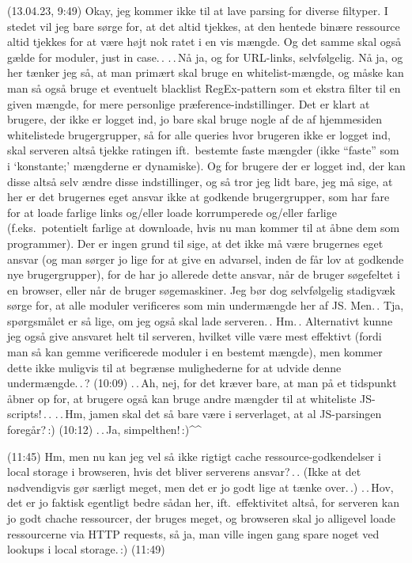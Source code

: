 \documentclass{report}
\begin{document}
(13.04.23, 9:49) Okay, jeg kommer ikke til at lave parsing for diverse filtyper. I stedet vil jeg bare sørge for, at det altid tjekkes, at den hentede binære ressource altid tjekkes for at være højt nok ratet i en vis mængde. Og det samme skal også gælde for moduler, just in case.\,. .\,.\,Nå ja, og for URL-links, selvfølgelig. Nå ja, og her tænker jeg så, at man primært skal bruge en whitelist-mængde, og måske kan man så også bruge et eventuelt blacklist RegEx-pattern som et ekstra filter til en given mængde, for mere personlige præference-indstillinger. Det er klart at brugere, der ikke er logget ind, jo bare skal bruge nogle af de af hjemmesiden whitelistede brugergrupper, så for alle queries hvor brugeren ikke er logget ind, skal serveren altså tjekke ratingen ift.\ bestemte faste mængder (ikke ``faste'' som i `konstante;' mængderne er dynamiske). Og for brugere der er logget ind, der kan disse altså selv ændre disse indstillinger, og så tror jeg lidt bare, jeg må sige, at her er det brugernes eget ansvar ikke at godkende brugergrupper, som har fare for at loade farlige links og/eller loade korrumperede og/eller farlige (f.eks.\ potentielt farlige at downloade, hvis nu man kommer til at åbne dem som programmer). Der er ingen grund til sige, at det ikke må være brugernes eget ansvar (og man sørger jo lige for at give en advarsel, inden de får lov at godkende nye brugergrupper), for de har jo allerede dette ansvar, når de bruger søgefeltet i en browser, eller når de bruger søgemaskiner. Jeg bør dog selvfølgelig stadigvæk sørge for, at alle moduler verificeres som min undermængde her af JS. Men.\,. Tja, spørgsmålet er så lige, om jeg også skal lade serveren.\,. Hm.\,. Alternativt kunne jeg også give ansvaret helt til serveren, hvilket ville være mest effektivt (fordi man så kan gemme verificerede moduler i en bestemt mængde), men kommer dette ikke muligvis til at begrænse mulighederne for at udvide denne undermængde.\,.\,? (10:09) .\,.\,Ah, nej, for det kræver bare, at man på et tidspunkt åbner op for, at brugere også kan bruge andre mængder til at whiteliste JS-scripts!\,.\,. .\,.\,Hm, jamen skal det så bare være i serverlaget, at al JS-parsingen foregår?\,:) (10:12) .\,.\,Ja, simpelthen!\,:)\textasciicircum\textasciicircum\ 

(11:45) Hm, men nu kan jeg vel så ikke rigtigt cache ressource-godkendelser i local storage i browseren, hvis det bliver serverens ansvar?\,.\,. (Ikke at det nødvendigvis gør særligt meget, men det er jo godt lige at tænke over.\,.) .\,.\,Hov, det er jo faktisk egentligt bedre sådan her, ift.\ effektivitet altså, for serveren kan jo godt chache ressourcer, der bruges meget, og browseren skal jo alligevel loade ressourcerne via HTTP requests, så ja, man ville ingen gang spare noget ved lookups i local storage.\,:) (11:49)
\end{document}
